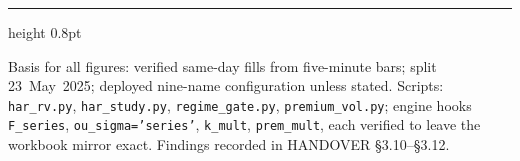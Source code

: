\documentclass[11pt,a4paper]{article}
\begin{document}
\vspace{0.4cm}
{\color{bcnavy}\hrule height 0.8pt}
\vspace{0.2cm}
{\footnotesize\color{bcgrey} Basis for all figures: verified same-day fills from
five-minute bars; split 23~May~2025; deployed nine-name configuration unless
stated. Scripts: \texttt{har\_rv.py}, \texttt{har\_study.py},
\texttt{regime\_gate.py}, \texttt{premium\_vol.py}; engine hooks
\texttt{F\_series}, \texttt{ou\_sigma='series'}, \texttt{k\_mult},
\texttt{prem\_mult}, each verified to leave the workbook mirror exact.
Findings recorded in HANDOVER \S3.10--\S3.12.}
\end{document}
